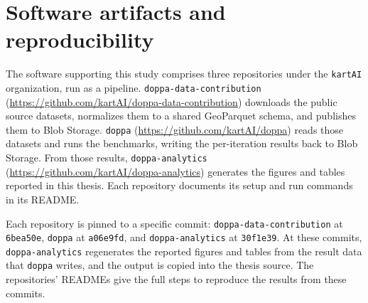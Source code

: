 \section{Software artifacts and reproducibility}
\label{appendix:software-and-reproducibility}

The software supporting this study comprises three repositories under the \texttt{kartAI} organization, run as a pipeline. \texttt{doppa-data-contribution} (\url{https://github.com/kartAI/doppa-data-contribution}) downloads the public source datasets, normalizes them to a shared GeoParquet schema, and publishes them to Blob Storage. \texttt{doppa} (\url{https://github.com/kartAI/doppa}) reads those datasets and runs the benchmarks, writing the per-iteration results back to Blob Storage. From those results, \texttt{doppa-analytics} (\url{https://github.com/kartAI/doppa-analytics}) generates the figures and tables reported in this thesis. Each repository documents its setup and run commands in its README.

Each repository is pinned to a specific commit: \texttt{doppa-data-contribution} at \texttt{6bea50e}, \texttt{doppa} at \texttt{a06e9fd}, and \texttt{doppa-analytics} at \texttt{30f1e39}. At these commits, \texttt{doppa-analytics} regenerates the reported figures and tables from the result data that \texttt{doppa} writes, and the output is copied into the thesis source. The repositories' READMEs give the full steps to reproduce the results from these commits.